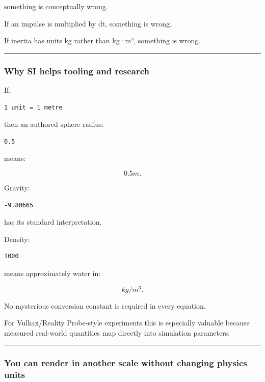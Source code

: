 something is conceptually wrong.

If an impulse is multiplied by dt, something is wrong.

If inertia has units kg rather than kg·m², something is wrong.

\begin{center}\rule{0.5\linewidth}{0.5pt}\end{center}

\subsubsection{Why SI helps tooling and research}\label{why-si-helps-tooling-and-research}

If:

\begin{verbatim}
1 unit = 1 metre
\end{verbatim}

then an authored sphere radius:

\begin{verbatim}
0.5
\end{verbatim}

means:

\[
0.5m.
\]

Gravity:

\begin{verbatim}
-9.80665
\end{verbatim}

has its standard interpretation.

Density:

\begin{verbatim}
1000
\end{verbatim}

means approximately water in:

\[
kg/m^3.
\]

No mysterious conversion constant is required in every equation.

For Vulkax/Reality Probe-style experiments this is especially valuable because measured real-world quantities map directly into simulation parameters.

\begin{center}\rule{0.5\linewidth}{0.5pt}\end{center}

\subsubsection{You can render in another scale without changing physics units}\label{you-can-render-in-another-scale-without-changing-physics-units}


